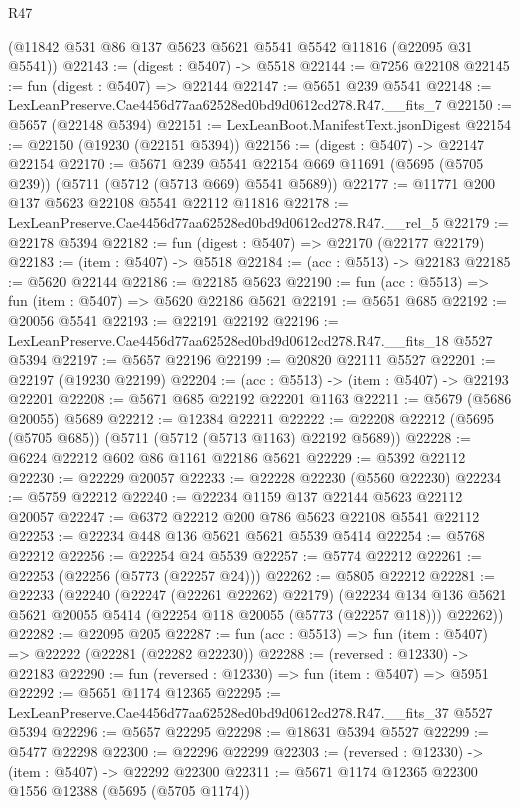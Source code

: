 \begin{lexlean}{R47}
\begin{coremodule}
    (@11842 @531 @86 @137 @5623 @5621 @5541 @5542 @11816 (@22095 @31 @5541))
@22143 := (digest : @5407) -> @5518
@22144 := @7256 @22108
@22145 := fun (digest : @5407) => @22144
@22147 := @5651 @239 @5541
@22148 := LexLeanPreserve.Cae4456d77aa62528ed0bd9d0612cd278.R47.__fits_7
@22150 := @5657 (@22148 @5394)
@22151 := LexLeanBoot.ManifestText.jsonDigest
@22154 := @22150 (@19230 (@22151 @5394))
@22156 := (digest : @5407) -> @22147 @22154
@22170 := @5671
    @239
    @5541
    @22154
    @669
    @11691
    (@5695 (@5705 @239))
    (@5711 (@5712 (@5713 @669) @5541 @5689))
@22177 := @11771 @200 @137 @5623 @22108 @5541 @22112 @11816
@22178 := LexLeanPreserve.Cae4456d77aa62528ed0bd9d0612cd278.R47.__rel_5
@22179 := @22178 @5394
@22182 := fun (digest : @5407) => @22170 (@22177 @22179)
@22183 := (item : @5407) -> @5518
@22184 := (acc : @5513) -> @22183
@22185 := @5620 @22144
@22186 := @22185 @5623
@22190 := fun (acc : @5513) => fun (item : @5407) => @5620 @22186 @5621
@22191 := @5651 @685
@22192 := @20056 @5541
@22193 := @22191 @22192
@22196 := LexLeanPreserve.Cae4456d77aa62528ed0bd9d0612cd278.R47.__fits_18 @5527 @5394
@22197 := @5657 @22196
@22199 := @20820 @22111 @5527
@22201 := @22197 (@19230 @22199)
@22204 := (acc : @5513) -> (item : @5407) -> @22193 @22201
@22208 := @5671 @685 @22192 @22201 @1163
@22211 := @5679 (@5686 @20055) @5689
@22212 := @12384 @22211
@22222 := @22208 @22212 (@5695 (@5705 @685)) (@5711 (@5712 (@5713 @1163) @22192 @5689))
@22228 := @6224 @22212 @602 @86 @1161 @22186 @5621
@22229 := @5392 @22112
@22230 := @22229 @20057
@22233 := @22228 @22230 (@5560 @22230)
@22234 := @5759 @22212
@22240 := @22234 @1159 @137 @22144 @5623 @22112 @20057
@22247 := @6372 @22212 @200 @786 @5623 @22108 @5541 @22112
@22253 := @22234 @448 @136 @5621 @5621 @5539 @5414
@22254 := @5768 @22212
@22256 := @22254 @24 @5539
@22257 := @5774 @22212
@22261 := @22253 (@22256 (@5773 (@22257 @24)))
@22262 := @5805 @22212
@22281 := @22233
    (@22240
      (@22247 (@22261 @22262) @22179)
      (@22234 @134 @136 @5621 @5621 @20055 @5414 (@22254 @118 @20055 (@5773 (@22257 @118))) @22262))
@22282 := @22095 @205
@22287 := fun (acc : @5513) => fun (item : @5407) => @22222 (@22281 (@22282 @22230))
@22288 := (reversed : @12330) -> @22183
@22290 := fun (reversed : @12330) => fun (item : @5407) => @5951
@22292 := @5651 @1174 @12365
@22295 := LexLeanPreserve.Cae4456d77aa62528ed0bd9d0612cd278.R47.__fits_37 @5527 @5394
@22296 := @5657 @22295
@22298 := @18631 @5394 @5527
@22299 := @5477 @22298
@22300 := @22296 @22299
@22303 := (reversed : @12330) -> (item : @5407) -> @22292 @22300
@22311 := @5671 @1174 @12365 @22300 @1556 @12388 (@5695 (@5705 @1174))

\end{coremodule}
\end{lexlean}

